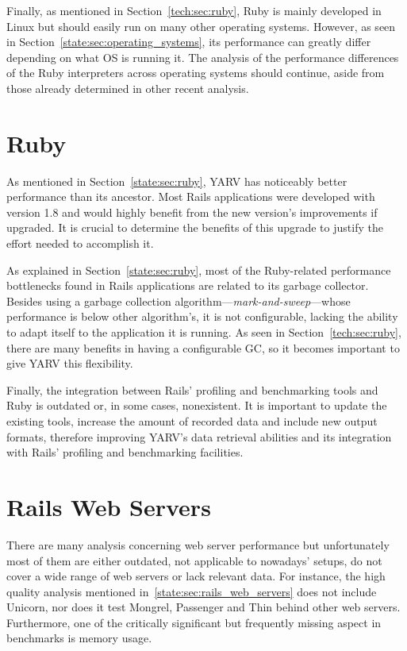 Finally, as mentioned in Section~\ref{tech:sec:ruby}, Ruby is mainly developed in Linux but should easily run on many other operating systems. However, as seen in Section~\ref{state:sec:operating_systems}, its performance can greatly differ depending on what OS is running it. The analysis of the performance differences of the Ruby interpreters across operating systems should continue, aside from those already determined in other recent analysis.

\section{Ruby}
As mentioned in Section~\ref{state:sec:ruby}, YARV has noticeably better performance than its ancestor. Most Rails applications were developed with version 1.8 and would highly benefit from the new version's improvements if upgraded. It is crucial to determine the benefits of this upgrade to justify the effort needed to accomplish it. 

As explained in Section~\ref{state:sec:ruby}, most of the Ruby-related performance bottlenecks found in Rails applications are related to its garbage collector. Besides using a garbage collection algorithm---\textit{mark-and-sweep}---whose performance is below other algorithm's, it is not configurable, lacking the ability to adapt itself to the application it is running. As seen in Section~\ref{tech:sec:ruby}, there are many benefits in having a configurable GC, so it becomes important to give YARV this flexibility. 

Finally, the integration between Rails' profiling and benchmarking tools and Ruby is outdated or, in some cases, nonexistent. It is important to update the existing tools, increase the amount of recorded data and include new output formats, therefore improving YARV's data retrieval abilities and its integration with Rails' profiling and benchmarking facilities.

\section{Rails Web Servers}
There are many analysis concerning web server performance but unfortunately most of them are either outdated, not applicable to nowadays' setups, do not cover a wide range of web servers or lack relevant data. For instance, the high quality analysis mentioned in~\ref{state:sec:rails_web_servers} does not include Unicorn, nor does it test Mongrel, Passenger and Thin behind other web servers. Furthermore, one of the critically significant but frequently missing aspect in benchmarks is memory usage.

